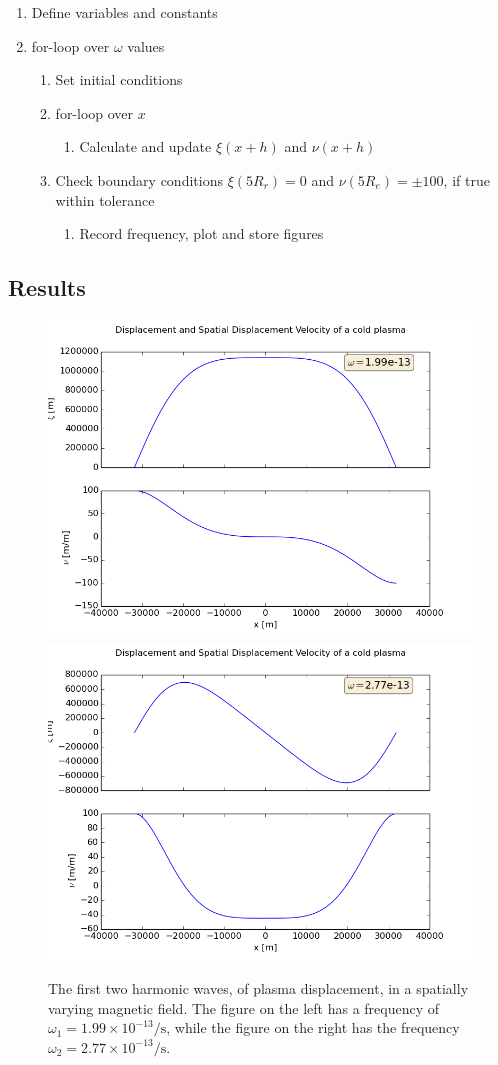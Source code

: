 \documentclass[x11names]{article}
\begin{document}
    \begin{enumerate}
      \item Define variables and constants
      \item for-loop over \(\omega\) values
        \begin{enumerate}
          \item Set initial conditions
          \item for-loop over \(x\)
            \begin{enumerate}
              \item Calculate and update $\xi(x + h)$ and $\nu(x + h)$
            \end{enumerate}
          \item Check boundary conditions \(\xi(5R_r) = 0\) and $\nu(5R_e) = \pm 100$, if true within tolerance
            \begin{enumerate}
              \item Record frequency, plot and store figures
            \end{enumerate}
        \end{enumerate}
    \end{enumerate}

\subsection{Results}

  \begin{figure}
    \includegraphics[width = 0.45\linewidth] {../source/wave19950}
    \includegraphics[width = 0.45\linewidth] {../source/wave27650}
    \caption{The first two harmonic waves, of plasma displacement, in a spatially varying magnetic field. The figure on the left has a frequency of \(\omega_1 =1.99\times 10^{-13} \si{\per \second}\), while the figure on the right has the frequency \(\omega_2 =2.77\times 10^{-13} \si{\per \second}\).}
    \label{fig:waves}
  \end{figure}
\end{document}
